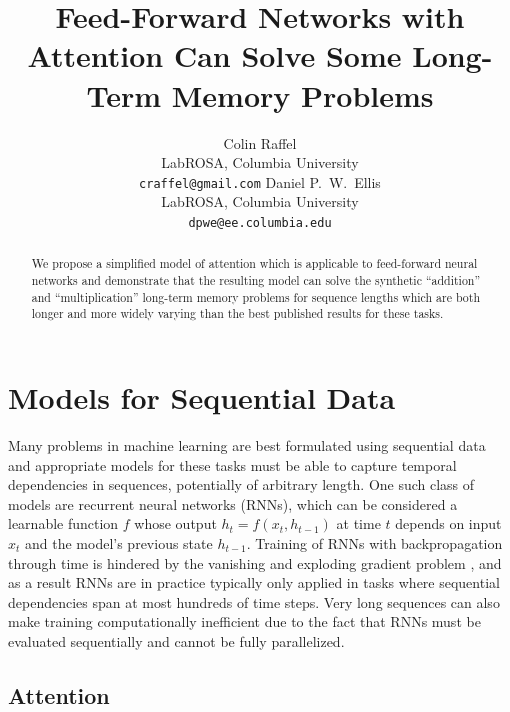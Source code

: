 \documentclass{article} %
\title{Feed-Forward Networks with Attention Can Solve Some Long-Term Memory Problems}
\author{Colin Raffel\\
LabROSA, Columbia University\\
\texttt{craffel@gmail.com}
\And
Daniel P.~W.~Ellis\\
LabROSA, Columbia University\\
\texttt{dpwe@ee.columbia.edu}
}
\begin{document}
\maketitle

\begin{abstract}
We propose a simplified model of attention which is applicable to feed-forward neural networks and demonstrate that the resulting model can solve the synthetic ``addition'' and ``multiplication'' long-term memory problems for sequence lengths which are both longer and more widely varying than the best published results for these tasks.
\end{abstract}

\section{Models for Sequential Data}

Many problems in machine learning are best formulated using sequential data and appropriate models for these tasks must be able to capture temporal dependencies in sequences, potentially of arbitrary length.
One such class of models are recurrent neural networks (RNNs), which can be considered a learnable function $f$ whose output $h_t = f(x_t, h_{t - 1})$ at time $t$ depends on input $x_t$ and the model's previous state $h_{t - 1}$.
Training of RNNs with backpropagation through time \citep{werbos1990backpropagation} is hindered by the vanishing and exploding gradient problem \citep{pascanu2012difficulty,hochreiter1997long,bengio1994learning}, and as a result RNNs are in practice typically only applied in tasks where sequential dependencies span at most hundreds of time steps.
Very long sequences can also make training computationally inefficient due to the fact that RNNs must be evaluated sequentially and cannot be fully parallelized.

\subsection{Attention}
\end{document}
